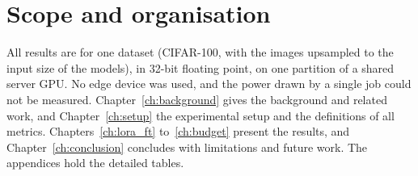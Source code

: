 \section{Scope and organisation}

All results are for one dataset (CIFAR-100, with the images upsampled to the input size of the models), in 32-bit
floating point, on one partition of a shared server GPU. No edge device was used, and the power drawn by a
single job could not be measured. Chapter~\ref{ch:background} gives the background and related work, and
Chapter~\ref{ch:setup} the experimental setup and the definitions of all metrics.
Chapters~\ref{ch:lora_ft} to~\ref{ch:budget} present the results, and Chapter~\ref{ch:conclusion} concludes with
limitations and future work. The appendices hold the detailed tables.
